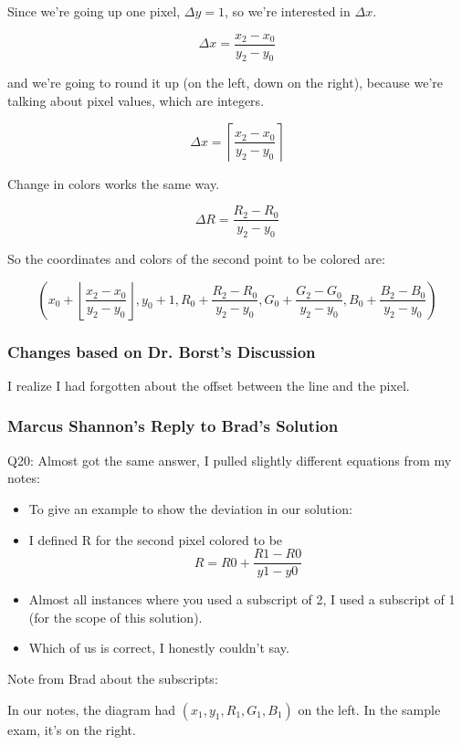 \documentclass[11pt]{article}
\begin{document}
\begin{spacing}{1.2}
Since we're going up one pixel, $\Delta y = 1$, so we're interested in $\Delta x$.  

$$\Delta x = \frac{x_2 - x_0}{y_2 - y_0}$$

and we're going to round it up (on the left, down on the right), because we're talking about pixel values, which are integers.  

$$\Delta x = \left\lceil\frac{x_2 - x_0}{y_2 - y_0}\right\rceil$$

Change in colors works the same way.  

$$\Delta R = \frac{R_2 - R_0}{y_2 - y_0}$$

So the coordinates and colors of the second point to be colored are:

$$\left( x_0 + \left\lfloor\frac{x_2 - x_0}{y_2 - y_0}\right\rfloor, 
y_0 + 1, 
R_0 + \frac{R_2 - R_0}{y_2 - y_0},
G_0 + \frac{G_2 - G_0}{y_2 - y_0},
B_0 + \frac{B_2 - B_0}{y_2 - y_0}
\right)$$

\subsubsection{Changes based on Dr. Borst's Discussion}

I realize I had forgotten about the offset between the line and the pixel.  

\subsubsection{Marcus Shannon's Reply to Brad's Solution}

Q20: Almost got the same answer, I pulled slightly different equations from my notes:
\begin{itemize}
    \item To give an example to show the deviation in our solution:
      \item I defined R for the second pixel colored to be
          $$R = R0 + \frac{R1 - R0}{y1 - y0}$$
    \item Almost all instances where you used a subscript of 2, I used a subscript of 1 (for the scope of this solution).
    \item Which of us is correct, I honestly couldn't say.
\end{itemize}

Note from Brad about the subscripts:

In our notes, the diagram had $(x_1,y_1,R_1,G_1,B_1)$ on the left.  In the sample exam, it's on the right.  


\end{spacing}
\end{document}
